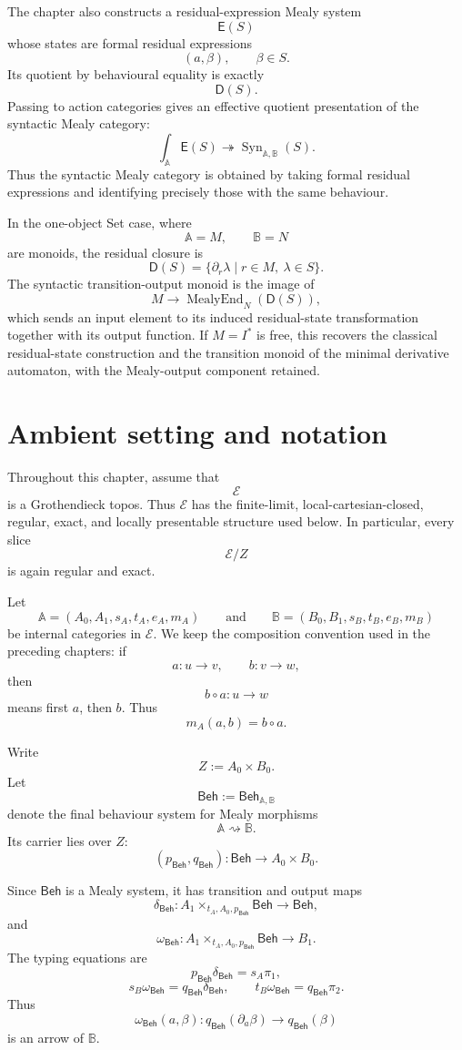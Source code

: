 The chapter also constructs a residual-expression Mealy system
\[
\mathsf E(S)
\]
whose states are formal residual expressions
\[
(a,\beta),
\qquad
\beta\in S.
\]
Its quotient by behavioural equality is exactly
\[
\mathsf D(S).
\]
Passing to action categories gives an effective quotient presentation of the
syntactic Mealy category:
\[
\int_{\mathbb A}\mathsf E(S)
\twoheadrightarrow
\operatorname{Syn}_{\mathbb A,\mathbb B}(S).
\]
Thus the syntactic Mealy category is obtained by taking formal residual
expressions and identifying precisely those with the same behaviour.

In the one-object Set case, where
\[
\mathbb A=M,
\qquad
\mathbb B=N
\]
are monoids, the residual closure is
\[
\mathsf D(S)
=
\{\partial_r\lambda\mid r\in M,\ \lambda\in S\}.
\]
The syntactic transition-output monoid is the image of
\[
M
\longrightarrow
\operatorname{MealyEnd}_N(\mathsf D(S)),
\]
which sends an input element to its induced residual-state transformation
together with its output function. If \(M=I^\ast\) is free, this recovers the
classical residual-state construction and the transition monoid of the
minimal derivative automaton, with the Mealy-output component retained.

\section{Ambient setting and notation}
\label{sec:canonical-residual-closure-ambient-setting}

Throughout this chapter, assume that
\[
\mathcal E
\]
is a Grothendieck topos. Thus \(\mathcal E\) has the finite-limit,
local-cartesian-closed, regular, exact, and locally presentable structure used
below. In particular, every slice
\[
\mathcal E/Z
\]
is again regular and exact.

Let
\[
\mathbb A
=
(A_0,A_1,s_A,t_A,e_A,m_A)
\qquad\text{and}\qquad
\mathbb B
=
(B_0,B_1,s_B,t_B,e_B,m_B)
\]
be internal categories in \(\mathcal E\). We keep the composition convention
used in the preceding chapters: if
\[
a:u\to v,
\qquad
b:v\to w,
\]
then
\[
b\circ a:u\to w
\]
means first \(a\), then \(b\). Thus
\[
m_A(a,b)=b\circ a.
\]

Write
\[
Z:=A_0\times B_0.
\]
Let
\[
\mathsf{Beh}
:=
\mathsf{Beh}_{\mathbb A,\mathbb B}
\]
denote the final behaviour system for Mealy morphisms
\[
\mathbb A\rightsquigarrow\mathbb B.
\]
Its carrier lies over \(Z\):
\[
(p_{\mathsf{Beh}},q_{\mathsf{Beh}}):
\mathsf{Beh}\to A_0\times B_0.
\]

Since \(\mathsf{Beh}\) is a Mealy system, it has transition and output maps
\[
\delta_{\mathsf{Beh}}:
A_1\times_{t_A,A_0,p_{\mathsf{Beh}}}\mathsf{Beh}
\to
\mathsf{Beh},
\]
and
\[
\omega_{\mathsf{Beh}}:
A_1\times_{t_A,A_0,p_{\mathsf{Beh}}}\mathsf{Beh}
\to
B_1.
\]
The typing equations are
\[
p_{\mathsf{Beh}}\delta_{\mathsf{Beh}}
=
s_A\pi_1,
\]
\[
s_B\omega_{\mathsf{Beh}}
=
q_{\mathsf{Beh}}\delta_{\mathsf{Beh}},
\qquad
t_B\omega_{\mathsf{Beh}}
=
q_{\mathsf{Beh}}\pi_2.
\]
Thus
\[
\omega_{\mathsf{Beh}}(a,\beta):
q_{\mathsf{Beh}}(\partial_a\beta)\to q_{\mathsf{Beh}}(\beta)
\]
is an arrow of \(\mathbb B\).

